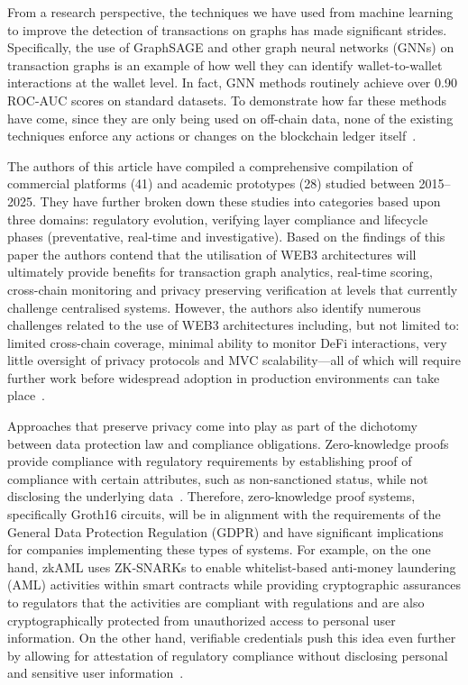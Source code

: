 \documentclass[journal]{IEEEtran}
\begin{document}
From a research perspective, the techniques we have used from machine learning to improve the detection of transactions on graphs has made significant strides. Specifically, the use of GraphSAGE and other graph neural networks (GNNs) on transaction graphs is an example of how well they can identify wallet-to-wallet interactions at the wallet level. In fact, GNN methods routinely achieve over 0.90 ROC-AUC scores on standard datasets. To demonstrate how far these methods have come, since they are only being used on off-chain data, none of the existing techniques enforce any actions or changes on the blockchain ledger itself~\cite{hamilton2017}.

The authors of this article have compiled a comprehensive compilation of commercial platforms (41) and academic prototypes (28) studied between 2015--2025. They have further broken down these studies into categories based upon three domains: regulatory evolution, verifying layer compliance and lifecycle phases (preventative, real-time and investigative). Based on the findings of this paper the authors contend that the utilisation of WEB3 architectures will ultimately provide benefits for transaction graph analytics, real-time scoring, cross-chain monitoring and privacy preserving verification at levels that currently challenge centralised systems. However, the authors also identify numerous challenges related to the use of WEB3 architectures including, but not limited to: limited cross-chain coverage, minimal ability to monitor DeFi interactions, very little oversight of privacy protocols and MVC scalability---all of which will require further work before widespread adoption in production environments can take place~\cite{mao2025}.

Approaches that preserve privacy come into play as part of the dichotomy between data protection law and compliance obligations. Zero-knowledge proofs provide compliance with regulatory requirements by establishing proof of compliance with certain attributes, such as non-sanctioned status, while not disclosing the underlying data~\cite{groth2016}. Therefore, zero-knowledge proof systems, specifically Groth16 circuits, will be in alignment with the requirements of the General Data Protection Regulation (GDPR) and have significant implications for companies implementing these types of systems. For example, on the one hand, zkAML uses ZK-SNARKs to enable whitelist-based anti-money laundering (AML) activities within smart contracts while providing cryptographic assurances to regulators that the activities are compliant with regulations and are also cryptographically protected from unauthorized access to personal user information. On the other hand, verifiable credentials push this idea even further by allowing for attestation of regulatory compliance without disclosing personal and sensitive user information~\cite{alego2025}.
\end{document}
